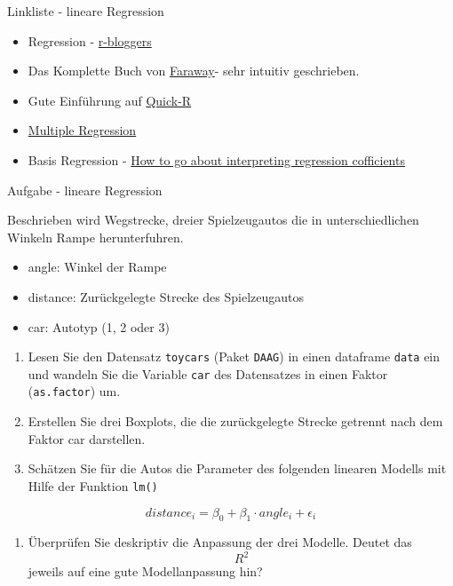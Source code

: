 \documentclass[ignorenonframetext,]{beamer}
\providecommand{\tightlist}{%
\setlength{\itemsep}{0pt}\setlength{\parskip}{0pt}}
\begin{document}
\begin{frame}{Linkliste - lineare Regression}

\begin{itemize}
\item
  Regression -
  \href{http://www.r-bloggers.com/r-tutorial-series-simple-linear-regression/}{r-bloggers}
\item
  Das Komplette Buch von
  \href{http://cran.r-project.org/doc/contrib/Faraway-PRA.pdf}{Faraway}-
  sehr intuitiv geschrieben.
\item
  Gute Einführung auf
  \href{http://www.statmethods.net/stats/regression.html}{Quick-R}
\item
  \href{https://www.r-bloggers.com/multiple-regression-part-1/}{Multiple
  Regression}
\item
  Basis Regression -
  \href{https://www.r-bloggers.com/how-to-go-about-interpreting-regression-cofficients/}{How
  to go about interpreting regression cofficients}
\end{itemize}

\end{frame}

\begin{frame}[fragile]{Aufgabe - lineare Regression}

Beschrieben wird Wegstrecke, dreier Spielzeugautos die in
unterschiedlichen Winkeln Rampe herunterfuhren.

\begin{itemize}
\tightlist
\item
  angle: Winkel der Rampe
\item
  distance: Zurückgelegte Strecke des Spielzeugautos
\item
  car: Autotyp (1, 2 oder 3)
\end{itemize}

\begin{enumerate}
\def\labelenumi{(\alph{enumi})}
\item
  Lesen Sie den Datensatz \texttt{toycars} (Paket \texttt{DAAG}) in
  einen dataframe \texttt{data} ein und wandeln Sie die Variable
  \texttt{car} des Datensatzes in einen Faktor (\texttt{as.factor}) um.
\item
  Erstellen Sie drei Boxplots, die die zurückgelegte Strecke getrennt
  nach dem Faktor car darstellen.
\item
  Schätzen Sie für die Autos die Parameter des folgenden linearen
  Modells mit Hilfe der Funktion \texttt{lm()}
\end{enumerate}

\[ distance_i= \beta_0 + \beta_1 \cdot angle_i + \epsilon_i\]

\begin{enumerate}
\def\labelenumi{(\alph{enumi})}
\setcounter{enumi}{3}
\tightlist
\item
  Überprüfen Sie deskriptiv die Anpassung der drei Modelle. Deutet das
  \[ R^2 \] jeweils auf eine gute Modellanpassung hin?
\end{enumerate}

\end{frame}
\end{document}
